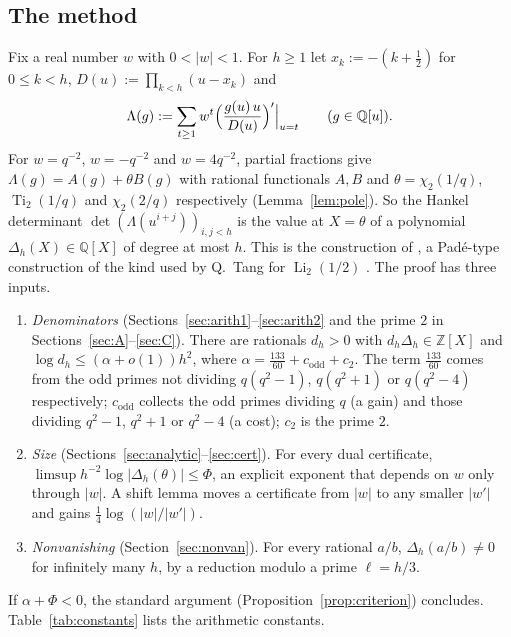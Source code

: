 \documentclass[11pt]{amsart}
\theoremstyle{definition}
\theoremstyle{remark}
\numberwithin{equation}{section}
\newcommand{\ZZ}{\mathbb{Z}}
\newcommand{\QQ}{\mathbb{Q}}
\newcommand{\Li}{\operatorname{Li}}
\newcommand{\Ti}{\operatorname{Ti}}
\begin{document}
\subsection{The method}\label{sec:method}
Fix a real number $w$ with $0<|w|<1$. For $h\ge1$ let $x_k:=-(k+\frac12)$ for $0\le k<h$, $D(u):=\prod_{k<h}(u-x_k)$
and
\begin{equation}\label{eq:Lambda}
  \Lambda(g):=\sum_{t\ge1}w^t\Bigl(\frac{g(u)\,u}{D(u)}\Bigr)'\Big|_{u=t}\qquad(g\in\QQ[u]).
\end{equation}
For $w=q^{-2}$, $w=-q^{-2}$ and $w=4q^{-2}$, partial fractions give $\Lambda(g)=A(g)+\theta B(g)$ with rational
functionals $A,B$ and $\theta=\chi_2(1/q)$, $\Ti_2(1/q)$ and $\chi_2(2/q)$ respectively (Lemma~\ref{lem:pole}). So the
Hankel determinant $\det(\Lambda(u^{i+j}))_{i,j<h}$ is the value at $X=\theta$ of a polynomial
$\Delta_h(X)\in\QQ[X]$ of degree at most $h$. This is the construction of \cite{Chi2Paper}, a Pad\'e-type
construction of the kind used by Q.~Tang for $\Li_2(1/2)$ \cite{TangLi2}. The proof has three inputs.
\begin{enumerate}
\item \emph{Denominators} (Sections~\ref{sec:arith1}--\ref{sec:arith2} and the prime $2$ in
  Sections~\ref{sec:A}--\ref{sec:C}). There are rationals $d_h>0$ with $d_h\Delta_h\in\ZZ[X]$ and
  $\log d_h\le(\alpha+o(1))h^2$, where $\alpha=\frac{133}{60}+c_{\mathrm{odd}}+c_2$. The term $\frac{133}{60}$ comes from
  the odd primes not dividing $q(q^2-1)$, $q(q^2+1)$ or $q(q^2-4)$ respectively; $c_{\mathrm{odd}}$ collects the odd
  primes dividing $q$ (a gain) and those dividing $q^2-1$, $q^2+1$ or $q^2-4$ (a cost); $c_2$ is the prime $2$.
\item \emph{Size} (Sections~\ref{sec:analytic}--\ref{sec:cert}). For every dual certificate,
  $\limsup h^{-2}\log|\Delta_h(\theta)|\le\Phi$, an explicit exponent that depends on $w$ only through $|w|$. A shift
  lemma moves a certificate from $|w|$ to any smaller $|w'|$ and gains $\frac14\log(|w|/|w'|)$.
\item \emph{Nonvanishing} (Section~\ref{sec:nonvan}). For every rational $a/b$, $\Delta_h(a/b)\ne0$ for infinitely
  many $h$, by a reduction modulo a prime $\ell=h/3$.
\end{enumerate}
If $\alpha+\Phi<0$, the standard argument (Proposition~\ref{prop:criterion}) concludes. Table~\ref{tab:constants}
lists the arithmetic constants.
\end{document}

